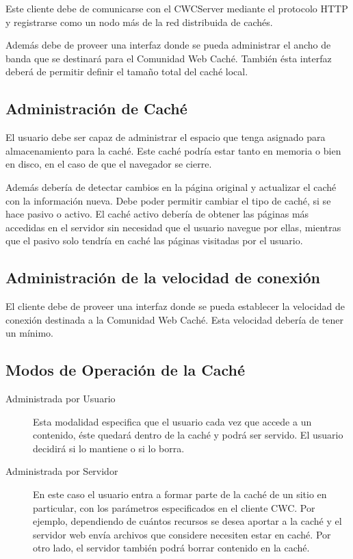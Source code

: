 Este cliente debe de comunicarse con el CWCServer mediante el protocolo HTTP y registrarse como un nodo más de la red distribuida de cachés.

Además debe de proveer una interfaz donde se pueda administrar el ancho de banda que se destinará para el Comunidad Web Caché. También ésta interfaz deberá de permitir definir el tamaño total del caché local.

\subsection{Administración de Caché}
El usuario debe ser capaz de administrar el espacio que tenga asignado para almacenamiento para la caché. Este caché podría estar tanto en memoria o bien en disco, en el caso de que el navegador se cierre.

Además debería de detectar cambios en la página original y actualizar el caché con la información nueva. 
Debe poder permitir cambiar el tipo de caché, si se hace pasivo o activo. El caché activo debería de obtener las páginas más accedidas en el servidor sin necesidad que el usuario navegue por ellas, mientras que el pasivo solo tendría en caché las páginas visitadas por el usuario.

\subsection{Administración de la velocidad de conexión}
El cliente debe de proveer una interfaz donde se pueda establecer la velocidad de conexión destinada a la Comunidad Web Caché. Esta velocidad debería de tener un mínimo.

\subsection{Modos de Operación de la Caché}
\begin{description}
\item[Administrada por Usuario] Esta modalidad especifica que el usuario cada vez que accede a un contenido, éste quedará dentro de la caché y podrá ser servido. El usuario decidirá si lo mantiene o si lo borra.

\item[Administrada por Servidor] En este caso el usuario entra a formar parte de la caché de un sitio en particular, con los parámetros especificados en el cliente CWC. Por ejemplo, dependiendo de cuántos recursos se desea aportar a la caché y el servidor web envía archivos que considere necesiten estar en caché. Por otro lado, el servidor también podrá borrar contenido en la caché.

\end{description}
